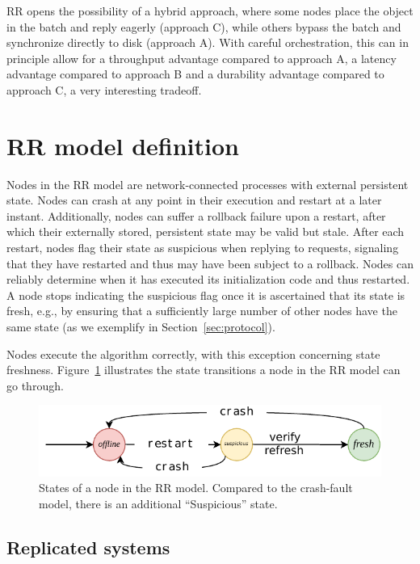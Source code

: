 \ac{RR} opens the possibility of a hybrid approach, where some
nodes place the object in the batch and reply eagerly (approach
C), while others bypass the batch and synchronize directly to
disk (approach A). With careful orchestration, this can in principle allow for
a throughput advantage compared to approach A, a latency
advantage compared to approach B and a durability advantage
compared to approach C, a very interesting tradeoff.

\section{\ac{RR} model definition}\label{sec:model}

Nodes in the \ac{RR} model are network-connected processes with external
persistent state. Nodes can crash at any point in their execution
and restart at a later instant.  Additionally, nodes can suffer a
rollback failure upon a restart, after which their externally
stored, persistent state may be valid but stale.  After each
restart, nodes flag their state as suspicious when replying to
requests, signaling that they have restarted and thus may have
been subject to a rollback. Nodes can reliably determine when it has executed its
initialization code and thus restarted. A node stops indicating
the suspicious flag once it is ascertained that its state is
fresh, e.g., by ensuring that a sufficiently large number of
other nodes have the same state (as we exemplify in
Section~\ref{sec:protocol}).

Nodes execute the algorithm correctly, with this exception
concerning state freshness. Figure~\ref{fig:states} illustrates
the state transitions a node in the \ac{RR} model can go through.

\begin{figure}[t]
    \centering
    \includegraphics[width=\linewidth]{img/RR_states}
    \caption{States of a node in the \ac{RR} model. Compared
      to the crash-fault model, there is an additional ``Suspicious''
      state.}\label{fig:states}
\end{figure}

\subsection{Replicated systems}\label{ssec:sys_model}

